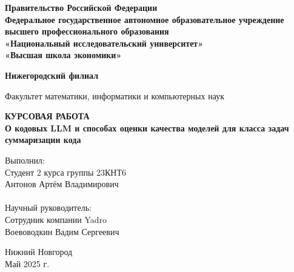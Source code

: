 \documentclass[14pt]{article}
\theoremstyle{definition}
\begin{document}
\begin{titlepage}
  \begin{center}
    \normalsize
   \textbf {Правительство Российской Федерации\\ 
Федеральное государственное автономное образовательное учреждение\\
   высшего профессионального образования\\
    «Национальный исследовательский университет» \\
     «Высшая школа экономики»}
   

    
    
    
    \textbf {Нижегородский филиал}
    
  \vfill
    Факультет математики, информатики и компьютерных наук\\
    
    
   
    \vfill

    \textbf{ КУРСОВАЯ РАБОТА}\\[5mm]
    
    {\normalsize  \textbf{О кодовых LLM и способах оценки качества моделей для класса задач
суммаризации кода}}
    
  \bigskip
    
    
\end{center}
\vfill

\newlength{\ML}
\hfill
\begin{minipage}{0.5\textwidth}
  Выполнил:\\
 Студент 2 курса группы 23КНТ6    
   \\
 Антонов Артём Владимирович\\ 


 \\Научный руководитель:\\
 Сотрудник компании Yadro\\ 
Воевоводкин Вадим Сергеевич\\
  \vspace{1cm}
 {\hspace{2.5cm}}
\end{minipage}%
\vfill

\begin{center}
  Нижний Новгород\\Май 2025 г.
\end{center}

\end{titlepage}
\end{document}
